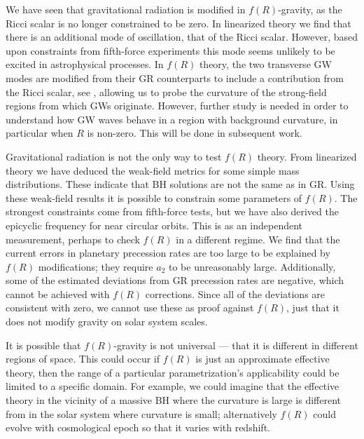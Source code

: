 We have seen that gravitational radiation is modified in $f(R)$-gravity, as the Ricci scalar is no longer constrained to be zero. In linearized theory we find that there is an additional mode of oscillation, that of the Ricci scalar. However, based upon constraints from fifth-force experiments this mode seems unlikely to be excited in astrophysical processes. In $f(R)$ theory, the two transverse GW modes are modified from their GR counterparts to include a contribution from the Ricci scalar, see , allowing us to probe the curvature of the strong-field regions from which GWs originate. However, further study is needed in order to understand how GW waves behave in a region with background curvature, in particular when $R$ is non-zero. This will be done in subsequent work.

Gravitational radiation is not the only way to test $f(R)$ theory. From linearized theory we have deduced the weak-field metrics for some simple mass distributions. These indicate that BH solutions are not the same as in GR. Using these weak-field results it is possible to constrain some parameters of $f(R)$. The strongest constraints come from fifth-force tests, but we have also derived the epicyclic frequency for near circular orbits. This is as an independent measurement, perhaps to check $f(R)$ in a different regime. We find that the current errors in planetary precession rates are too large to be explained by $f(R)$ modifications; they require $a_2$ to be unreasonably large. Additionally, some of the estimated deviations from GR precession rates are negative, which cannot be achieved with $f(R)$ corrections. Since all of the deviations are consistent with zero, we cannot use these as proof against $f(R)$, just that it does not modify gravity on solar system scales.

It is possible that $f(R)$-gravity is not universal --- that it is different in different regions of space. This could occur if $f(R)$ is just an approximate effective theory, then the range of a particular parametrization's applicability could be limited to a specific domain. For example, we could imagine that the effective theory in the vicinity of a massive BH where the curvature is large is different from in the solar system where curvature is small; alternatively $f(R)$ could evolve with cosmological epoch so that it varies with redshift.

